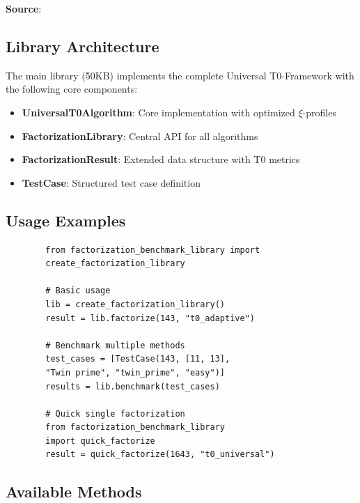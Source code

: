 	\textbf{Source}: 
	
	\subsection{Library Architecture}
	
	The main library (50KB) implements the complete Universal T0-Framework with the following core components:
	
	\begin{itemize}
		\item \textbf{UniversalT0Algorithm}: Core implementation with optimized $\xi$-profiles
		\item \textbf{FactorizationLibrary}: Central API for all algorithms
		\item \textbf{FactorizationResult}: Extended data structure with T0 metrics
		\item \textbf{TestCase}: Structured test case definition
	\end{itemize}
	
	\subsection{Usage Examples}
	
	\begin{verbatim}
		from factorization_benchmark_library import 
		create_factorization_library
		
		# Basic usage
		lib = create_factorization_library()
		result = lib.factorize(143, "t0_adaptive")
		
		# Benchmark multiple methods
		test_cases = [TestCase(143, [11, 13], 
		"Twin prime", "twin_prime", "easy")]
		results = lib.benchmark(test_cases)
		
		# Quick single factorization
		from factorization_benchmark_library 
		import quick_factorize
		result = quick_factorize(1643, "t0_universal")
	\end{verbatim}
	
	\subsection{Available Methods}
	
